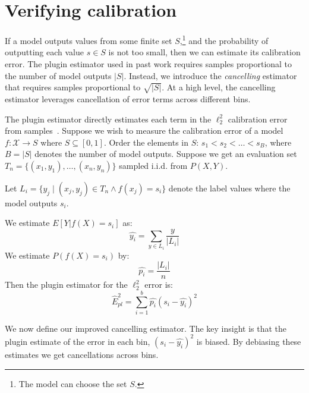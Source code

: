 \section{Verifying calibration}
\label{sec:verifying_calibration}

If a model outputs values from some finite set $S$,\footnote{The model can choose the set $S$.} and the probability of outputting each value $s \in S$ is not too small, then we can estimate its calibration error. The plugin estimator used in past work requires samples proportional to the number of model outputs $|S|$. Instead, we introduce the \emph{cancelling} estimator that requires samples proportional to $\sqrt{|S|}$. At a high level, the cancelling estimator leverages cancellation of error terms across different bins.


The plugin estimator directly estimates each term in the $\ell_2^2$ calibration error from samples~\cite{nguyen2015posterior, hendrycks2019anomaly, kuleshov2015calibrated, hendrycks2019pretraining}. Suppose we wish to measure the calibration error of a model $f : \mathcal{X} \to S$ where $S \subseteq [0, 1]$. Order the elements in $S$: $s_1 < s_2 < \dots < s_B$, where $B = |S|$ denotes the number of model outputs. Suppose we get an evaluation set $T_n = \{(x_1, y_1), \dots, (x_n, y_n)\}$ sampled i.i.d. from $P(X, Y)$.

\begin{definition}
\label{dfn:plugin-estimator}
Let $L_i = \{ y_j \; | \; (x_j, y_j) \in T_n\wedge f(x_j) = s_i \}$ denote the label values where the model outputs $s_i$.

We estimate $E[Y | f(X) = s_i]$ as:
\[ \hat{y_i} = \sum_{y \in L_i} \frac{y}{|L_i|} \] 
We estimate $P(f(X) = s_i)$ by:
\[ \hat{p_i} = \frac{|L_i|}{n} \]
Then the plugin estimator for the $\ell_2^2$ error is:
\[ \hat{E}_{pl}^2 = \sum_{i=1}^b \hat{p_i} (s_i - \hat{y_i})^2 \]
\end{definition}

We now define our improved cancelling estimator. The key insight is that the plugin estimate of the error in each bin, $(s_i - \hat{y_i})^2$ is biased. By debiasing these estimates we get cancellations across bins.

